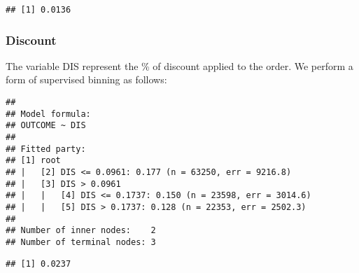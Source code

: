 \documentclass[
]{article}
\newenvironment{Shaded}{\begin{snugshade}}{\end{snugshade}}
\newcommand{\DataTypeTok}[1]{\textcolor[rgb]{0.13,0.29,0.53}{#1}}
\newcommand{\FloatTok}[1]{\textcolor[rgb]{0.00,0.00,0.81}{#1}}
\newcommand{\KeywordTok}[1]{\textcolor[rgb]{0.13,0.29,0.53}{\textbf{#1}}}
\newcommand{\NormalTok}[1]{#1}
\newcommand{\OperatorTok}[1]{\textcolor[rgb]{0.81,0.36,0.00}{\textbf{#1}}}
\newcommand{\StringTok}[1]{\textcolor[rgb]{0.31,0.60,0.02}{#1}}
\begin{document}
\begin{verbatim}
## [1] 0.0136
\end{verbatim}

\hypertarget{discount}{%
\subsubsection{Discount}\label{discount}}

The variable DIS represent the \% of discount applied to the order. We
perform a form of supervised binning as follows:

\begin{Shaded}
\end{Shaded}

\begin{verbatim}
## 
## Model formula:
## OUTCOME ~ DIS
## 
## Fitted party:
## [1] root
## |   [2] DIS <= 0.0961: 0.177 (n = 63250, err = 9216.8)
## |   [3] DIS > 0.0961
## |   |   [4] DIS <= 0.1737: 0.150 (n = 23598, err = 3014.6)
## |   |   [5] DIS > 0.1737: 0.128 (n = 22353, err = 2502.3)
## 
## Number of inner nodes:    2
## Number of terminal nodes: 3
\end{verbatim}

\begin{Shaded}
\end{Shaded}

\begin{verbatim}
## [1] 0.0237
\end{verbatim}

\begin{Shaded}
\end{Shaded}
\end{document}
